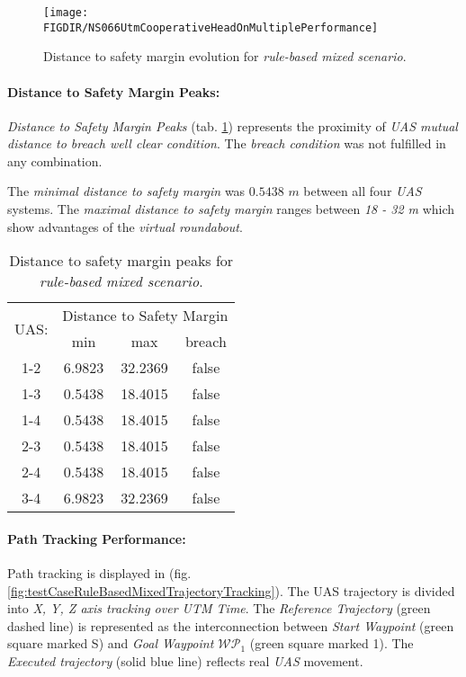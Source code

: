 \begin{figure}[H]
	\centering
	\texttt{[image: \\FIGDIR/NS066UtmCooperativeHeadOnMultiplePerformance]}
	\caption{Distance to safety margin evolution for \emph{rule-based mixed scenario}.}
	\label{fig:testRuleBasedMultipleAvoidancePerformance}
\end{figure}

\paragraph{Distance to Safety Margin Peaks:} \emph{Distance to Safety Margin Peaks} (tab. \ref{tab:testCaseRuleBasedMixedSafetyMarginDistances}) represents the proximity of \emph{UAS mutual distance to breach well clear condition}. The \emph{breach condition} was not fulfilled in any combination. 

The \emph{minimal distance to safety margin} was $0.5438$ $m$ between all four \emph{UAS} systems. The \emph{maximal distance to safety margin} ranges between \emph{18 - 32 m} which show advantages of the \emph{virtual roundabout}.

\begin{table}[H]
	\centering
	\begin{tabular}{c||c|c|c}
		\multirow{2}{*}{UAS:} & \multicolumn{3}{c}{Distance to Safety Margin} \\ \cline{2-4} 
				  & min          & max         & breach         \\ \hline\hline
			1-2   & 6.9823       & 32.2369     & false          \\ \hline
			1-3   & 0.5438       & 18.4015     & false          \\ \hline
			1-4   & 0.5438       & 18.4015     & false          \\ \hline
			2-3   & 0.5438       & 18.4015     & false          \\ \hline
			2-4   & 0.5438       & 18.4015     & false          \\ \hline
			3-4   & 6.9823       & 32.2369     & false          \\ 
	\end{tabular}
	\caption{Distance to safety margin peaks for \emph{rule-based mixed scenario}.}
	\label{tab:testCaseRuleBasedMixedSafetyMarginDistances}
\end{table}


\paragraph{Path Tracking Performance:} Path tracking is displayed in (fig. \ref{fig:testCaseRuleBasedMixedTrajectoryTracking}). The UAS trajectory is divided into \emph{X, Y, Z axis tracking over UTM Time}. The \emph{Reference Trajectory} (green dashed line) is represented as the interconnection between \emph{Start Waypoint} (green square marked S) and  \emph{Goal Waypoint $\mathscr{WP}_1$} (green square marked 1). The \emph{Executed trajectory} (solid blue  line) reflects real \emph{UAS} movement.

